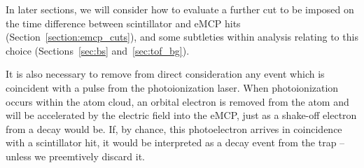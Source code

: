 In later sections, we will consider how to evaluate a further cut to be imposed on the time difference between scintillator and eMCP hits (Section~\ref{section:emcp_cuts}), and some subtleties within analysis relating to this choice (Sections~\ref{sec:bs} and~\ref{sec:tof_bg}).



It is also necessary to remove from direct consideration any event which is coincident with a pulse from the photoionization laser.  When photoionization occurs within the atom cloud, an orbital electron is removed from the atom and will be accelerated by the electric field into the eMCP, just as a shake-off electron from a decay would be.  If, by chance, this photoelectron arrives in coincidence with a scintillator hit, it would be interpreted as a decay event from the trap -- unless we preemtively discard it.  

